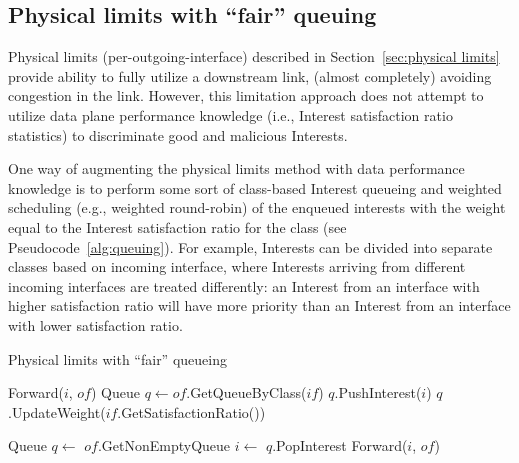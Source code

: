 \subsection{Physical limits with ``fair'' queuing}
\label{sec:queuing}

Physical limits (per-outgoing-interface) described in Section~\ref{sec:physical limits} provide ability to fully utilize a downstream link, (almost completely) avoiding congestion in the link.
However, this limitation approach does not attempt to utilize data plane performance knowledge (i.e., Interest satisfaction ratio statistics) to discriminate good and malicious Interests.

One way of augmenting the physical limits method with data performance knowledge is to perform some sort of class-based Interest queueing and weighted scheduling (e.g., weighted round-robin) of the enqueued interests with the weight equal to the Interest satisfaction ratio for the class (see Pseudocode~\ref{alg:queuing}).
For example, Interests can be divided into separate classes based on incoming interface, where Interests arriving from different incoming interfaces are treated differently:
an Interest from an interface with higher satisfaction ratio will have more priority than an Interest from an interface with lower satisfaction ratio.



\begin{algorithm}[h]
\caption{Physical limits with ``fair'' queueing}
\label{alg:queuing}
\begin{algorithmic}[1]
        \State Forward($i$, $of$)
    \Else
        \State Queue $q \leftarrow of$.GetQueueByClass($if$)
        \State $q$.PushInterest($i$)
        \State $q$.UpdateWeight($if$.GetSatisfactionRatio())
    \EndIf
\EndFor
\EndFunction

\vspace{0.2cm}
\State{} 
    \State{} 
    \State Queue $q \leftarrow$ $of$.GetNonEmptyQueue 
    \State $i \leftarrow$ $q$.PopInterest
    \State Forward($i$, $of$)
\EndFunction
\end{algorithmic}
\end{algorithm}

